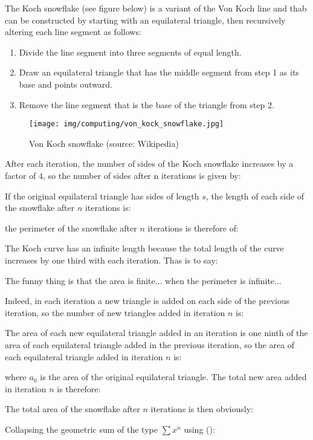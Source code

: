 	The Koch snowflake (see figure below) is a variant of the Von Koch line and thab can be constructed by starting with an equilateral triangle, then recursively altering each line segment as follows:
	\begin{enumerate}
		\item Divide the line segment into three segments of equal length.
		\item Draw an equilateral triangle that has the middle segment from step 1 as its base and points outward.
		\item Remove the line segment that is the base of the triangle from step 2.
	\end{enumerate}
	\begin{figure}[H]
		\centering
		\texttt{[image: img/computing/von\_kock\_snowflake.jpg]}
		\caption[Von Koch snowflake]{Von Koch snowflake (source: Wikipedia)}
	\end{figure}
	After each iteration, the number of sides of the Koch snowflake increases by a factor of $4$, so the number of sides after n iterations is given by:
	
	If the original equilateral triangle has sides of length $s$, the length of each side of the snowflake after $n$ iterations is:
	
	the perimeter of the snowflake after $n$ iterations is therefore of:
	
	The Koch curve has an infinite length because the total length of the curve increases by one third with each iteration. Thas is to say:
	
	The funny thing is that the area is finite... when the perimeter is infinite...
	
	Indeed, in each iteration a new triangle is added on each side of the previous iteration, so the number of new triangles added in iteration $n$ is:
	
	The area of each new equilateral triangle added in an iteration is one ninth of the area of each equilateral  triangle added in the previous iteration, so the area of each equilateral  triangle added in iteration $n$ is:
	
	where $a_0$ is the area of the original equilateral  triangle. The total new area added in iteration $n$ is therefore:
	
	The total area of the snowflake after $n$ iterations is then obviously:
	
	Collapsing the geometric sum of the type $\sum x^n$ using ():
	
